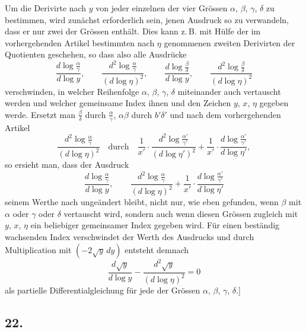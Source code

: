 \documentclass[10pt,a4paper]{article}
\begin{document}
Um die Derivirte nach $y$ von jeder einzelnen der vier Gr\"ossen $\alpha$,
$\beta$, $\gamma$, $\delta$ zu bestimmen, wird zun\"achst erforderlich sein,
jenen Ausdruck so zu verwandeln, dass er nur zwei der Gr\"ossen enth\"alt.
Dies kann z.\,B. mit H\"ulfe der im vorhergehenden Artikel bestimmten nach
$\eta$ genommenen zweiten Derivirten der Quotienten geschehen, so dass also
alle Ausdr\"ucke
\[
\frac{d\log\tfrac{\alpha}{\gamma}}{d\log y}, \qquad
\frac{d^2\log\tfrac{\alpha}{\gamma}}{(d\log\eta)^2}, \qquad
\frac{d\log\tfrac{\beta}{\delta}}{d\log y}, \qquad
\frac{d^2\log\tfrac{\beta}{\delta}}{(d\log\eta)^2}
\]
verschwinden, in welcher Reihenfolge $\alpha$, $\beta$, $\gamma$, $\delta$
miteinander auch vertauscht werden und welcher gemeinsame Index ihnen und
den Zeichen $y$, $x$, $\eta$ gegeben werde. Ersetzt man $\tfrac{\beta}{\delta}$
durch $\tfrac{\alpha}{\gamma}$, $\alpha\beta$ durch $b'\delta'$ und nach
dem vorhergehenden Artikel
\[
\frac{d^2\log\tfrac{\alpha}{\gamma}}{(d\log\eta)^2}\quad\text{durch}\quad
\frac{1}{x'}\cdot\frac{d^2\log\tfrac{\alpha'}{\gamma'}}{(d\log\eta')^2}
 + \frac{1}{x'}\cdot\frac{d\log\tfrac{\alpha'}{\gamma'}}{d\log\eta'},
\]
so ersieht man, dass der Ausdruck
\[
\frac{d\log\tfrac{\alpha}{\gamma}}{d\log y}, \qquad
\frac{d^2\log\tfrac{\alpha}{\gamma}}{(d\log\eta)^2}
 + \frac{1}{x'}\cdot\frac{d\log\tfrac{\alpha'}{\gamma'}}{d\log\eta'}
\]
seinem Werthe nach unge\"andert bleibt, nicht nur, wie eben gefunden, wenn
$\beta$ mit $\alpha$ oder $\gamma$ oder $\delta$ vertauscht wird, sondern auch
wenn diesen Gr\"ossen zugleich mit $y$, $x$, $\eta$ ein beliebiger gemeinsamer
Index gegeben wird. F\"ur einen best\"andig wachsenden Index verschwindet der
Werth des Ausdrucks und durch Multiplication mit $(-2\sqrt{y}\,dy)$ entsteht
demnach
\[
\frac{d\sqrt{y}}{d\log y} - \frac{d^2\sqrt{y}}{(d\log\eta)^2} = 0
\]
als partielle Differentialgleichung f\"ur jede der Gr\"ossen $\alpha$,
$\beta$, $\gamma$, $\delta$.]


\subsection*{22.}
\end{document}
